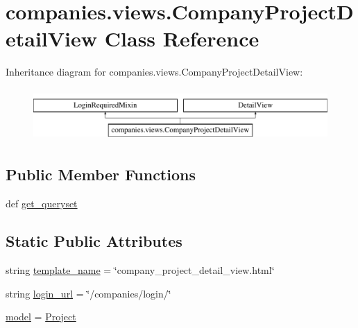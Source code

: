 \hypertarget{classcompanies_1_1views_1_1_company_project_detail_view}{\section{companies.\-views.\-Company\-Project\-Detail\-View Class Reference}
\label{classcompanies_1_1views_1_1_company_project_detail_view}
}
Inheritance diagram for companies.\-views.\-Company\-Project\-Detail\-View\-:\begin{figure}[H]
\begin{center}
\leavevmode
\includegraphics[height=2.000000cm]{classcompanies_1_1views_1_1_company_project_detail_view}
\end{center}
\end{figure}
\subsection*{Public Member Functions}
\begin{DoxyCompactItemize}
\item 
def \hyperlink{classcompanies_1_1views_1_1_company_project_detail_view_a53609a59a8945a1a9e6ceca4b024a376}{get\-\_\-queryset}
\end{DoxyCompactItemize}
\subsection*{Static Public Attributes}
\begin{DoxyCompactItemize}
\item 
string \hyperlink{classcompanies_1_1views_1_1_company_project_detail_view_a683f0a62c8c6511d59465ee294889e90}{template\-\_\-name} = \char`\"{}company\-\_\-project\-\_\-detail\-\_\-view.\-html\char`\"{}
\item 
string \hyperlink{classcompanies_1_1views_1_1_company_project_detail_view_a3ab5b3d8824353ab40e76b19a7c66dba}{login\-\_\-url} = \char`\"{}/companies/login/\char`\"{}
\item 
\hyperlink{classcompanies_1_1views_1_1_company_project_detail_view_af00aea6a349ffb79b8aeedcddda21ad0}{model} = \hyperlink{classprojects_1_1models_1_1_project}{Project}
\end{DoxyCompactItemize}


